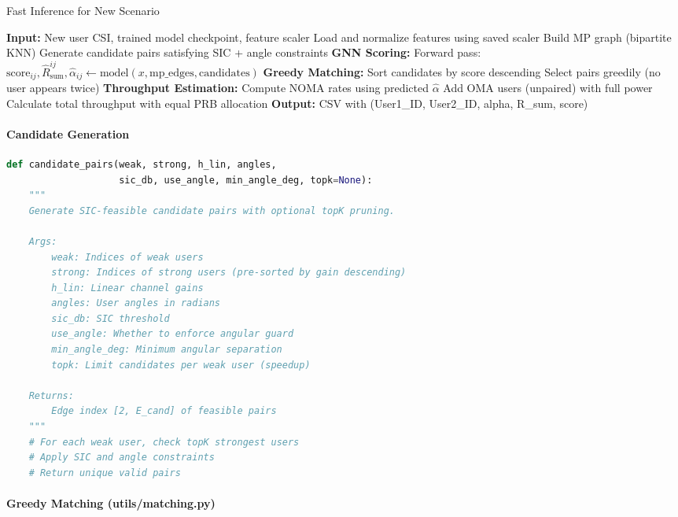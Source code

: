 \documentclass[12pt,a4paper]{article}
\begin{document}
\begin{algorithm}[H]
\caption{Fast Inference for New Scenario}
\begin{algorithmic}[1]
\State \textbf{Input:} New user CSI, trained model checkpoint, feature scaler
\State Load and normalize features using saved scaler
\State Build MP graph (bipartite KNN)
\State Generate candidate pairs satisfying SIC + angle constraints
\State \textbf{GNN Scoring:}
\State \quad Forward pass: $\text{score}_{ij}, \hat{R}_{\text{sum}}^{ij}, \hat{\alpha}_{ij} \leftarrow \text{model}(x, \text{mp\_edges}, \text{candidates})$
\State \textbf{Greedy Matching:}
\State \quad Sort candidates by score descending
\State \quad Select pairs greedily (no user appears twice)
\State \textbf{Throughput Estimation:}
\State \quad Compute NOMA rates using predicted $\hat{\alpha}$
\State \quad Add OMA users (unpaired) with full power
\State \quad Calculate total throughput with equal PRB allocation
\State \textbf{Output:} CSV with (User1\_ID, User2\_ID, alpha, R\_sum, score)
\end{algorithmic}
\end{algorithm}

\paragraph{Candidate Generation}

\begin{lstlisting}[language=Python]
def candidate_pairs(weak, strong, h_lin, angles, 
                    sic_db, use_angle, min_angle_deg, topk=None):
    """
    Generate SIC-feasible candidate pairs with optional topK pruning.
    
    Args:
        weak: Indices of weak users
        strong: Indices of strong users (pre-sorted by gain descending)
        h_lin: Linear channel gains
        angles: User angles in radians
        sic_db: SIC threshold
        use_angle: Whether to enforce angular guard
        min_angle_deg: Minimum angular separation
        topk: Limit candidates per weak user (speedup)
    
    Returns:
        Edge index [2, E_cand] of feasible pairs
    """
    # For each weak user, check topK strongest users
    # Apply SIC and angle constraints
    # Return unique valid pairs
\end{lstlisting}

\paragraph{Greedy Matching (utils/matching.py)}
\end{document}

